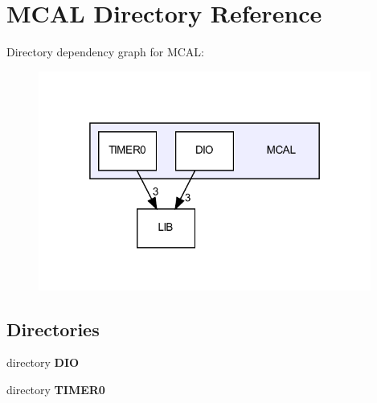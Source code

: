 \section{M\+C\+AL Directory Reference}
\label{dir_aeef58f5a946ad8e66cca46db86d7cf5}
Directory dependency graph for M\+C\+AL\+:\nopagebreak
\begin{figure}[H]
\begin{center}
\leavevmode
\includegraphics[width=310pt]{dir_aeef58f5a946ad8e66cca46db86d7cf5_dep}
\end{center}
\end{figure}
\subsection*{Directories}
\begin{DoxyCompactItemize}
\item 
directory \textbf{ D\+IO}
\item 
directory \textbf{ T\+I\+M\+E\+R0}
\end{DoxyCompactItemize}
